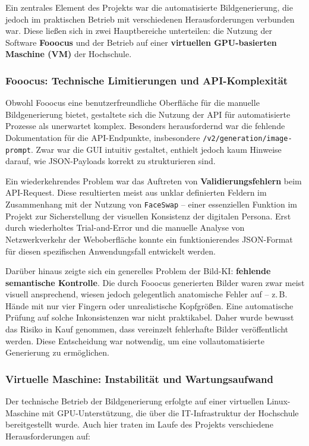 \documentclass[a4paper,12pt]{article}
\begin{document}
Ein zentrales Element des Projekts war die automatisierte Bildgenerierung, die jedoch im praktischen Betrieb mit verschiedenen Herausforderungen verbunden war. Diese ließen sich in zwei Hauptbereiche unterteilen: die Nutzung der Software \textbf{Fooocus} und der Betrieb auf einer \textbf{virtuellen GPU-basierten Maschine (VM)} der Hochschule.

\subsubsection*{Fooocus: Technische Limitierungen und API-Komplexität}

Obwohl Fooocus eine benutzerfreundliche Oberfläche für die manuelle Bildgenerierung bietet, gestaltete sich die Nutzung der API für automatisierte Prozesse als unerwartet komplex. Besonders herausfordernd war die fehlende Dokumentation für die API-Endpunkte, insbesondere \texttt{/v2/generation/image-prompt}. Zwar war die GUI intuitiv gestaltet, enthielt jedoch kaum Hinweise darauf, wie JSON-Payloads korrekt zu strukturieren sind.

Ein wiederkehrendes Problem war das Auftreten von \textbf{Validierungsfehlern} beim API-Request. Diese resultierten meist aus unklar definierten Feldern im Zusammenhang mit der Nutzung von \texttt{FaceSwap} – einer essenziellen Funktion im Projekt zur Sicherstellung der visuellen Konsistenz der digitalen Persona. Erst durch wiederholtes Trial-and-Error und die manuelle Analyse von Netzwerkverkehr der Weboberfläche konnte ein funktionierendes JSON-Format für diesen spezifischen Anwendungsfall entwickelt werden.

Darüber hinaus zeigte sich ein generelles Problem der Bild-KI: \textbf{fehlende semantische Kontrolle}. Die durch Fooocus generierten Bilder waren zwar meist visuell ansprechend, wiesen jedoch gelegentlich anatomische Fehler auf – z.\,B. Hände mit nur vier Fingern oder unrealistische Kopfgrößen. Eine automatische Prüfung auf solche Inkonsistenzen war nicht praktikabel. Daher wurde bewusst das Risiko in Kauf genommen, dass vereinzelt fehlerhafte Bilder veröffentlicht werden. Diese Entscheidung war notwendig, um eine vollautomatisierte Generierung zu ermöglichen.

\subsubsection*{Virtuelle Maschine: Instabilität und Wartungsaufwand}

Der technische Betrieb der Bildgenerierung erfolgte auf einer virtuellen Linux-Maschine mit GPU-Unterstützung, die über die IT-Infrastruktur der Hochschule bereitgestellt wurde. Auch hier traten im Laufe des Projekts verschiedene Herausforderungen auf:
\end{document}
